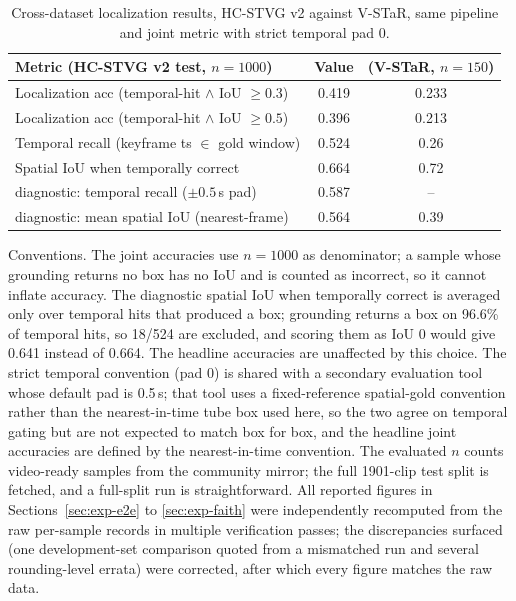\begin{table}[htbp]
\centering
\small
\begin{tabular}{lcc}
\toprule
Metric (HC-STVG v2 test, $n=1000$) & Value & (V-STaR, $n=150$) \\
\midrule
Localization acc (temporal-hit $\wedge$ IoU $\ge 0.3$) & 0.419 & 0.233 \\
Localization acc (temporal-hit $\wedge$ IoU $\ge 0.5$) & 0.396 & 0.213 \\
Temporal recall (keyframe ts $\in$ gold window) & 0.524 & 0.26 \\
Spatial IoU when temporally correct & 0.664 & 0.72 \\
diagnostic: temporal recall ($\pm 0.5$\,s pad) & 0.587 & -- \\
diagnostic: mean spatial IoU (nearest-frame) & 0.564 & 0.39 \\
\bottomrule
\end{tabular}
\caption{Cross-dataset localization results, HC-STVG v2 against V-STaR, same pipeline and joint metric with strict temporal pad 0.}
\label{tab:cross}
\end{table}

Conventions. The joint accuracies use $n=1000$ as denominator; a sample whose grounding returns no box has no IoU and is counted as incorrect, so it cannot inflate accuracy. The diagnostic spatial IoU when temporally correct is averaged only over temporal hits that produced a box; grounding returns a box on 96.6\% of temporal hits, so 18/524 are excluded, and scoring them as IoU 0 would give 0.641 instead of 0.664. The headline accuracies are unaffected by this choice. The strict temporal convention (pad 0) is shared with a secondary evaluation tool whose default pad is 0.5\,s; that tool uses a fixed-reference spatial-gold convention rather than the nearest-in-time tube box used here, so the two agree on temporal gating but are not expected to match box for box, and the headline joint accuracies are defined by the nearest-in-time convention. The evaluated $n$ counts video-ready samples from the community mirror; the full 1901-clip test split is fetched, and a full-split run is straightforward. All reported figures in Sections~\ref{sec:exp-e2e} to \ref{sec:exp-faith} were independently recomputed from the raw per-sample records in multiple verification passes; the discrepancies surfaced (one development-set comparison quoted from a mismatched run and several rounding-level errata) were corrected, after which every figure matches the raw data.

